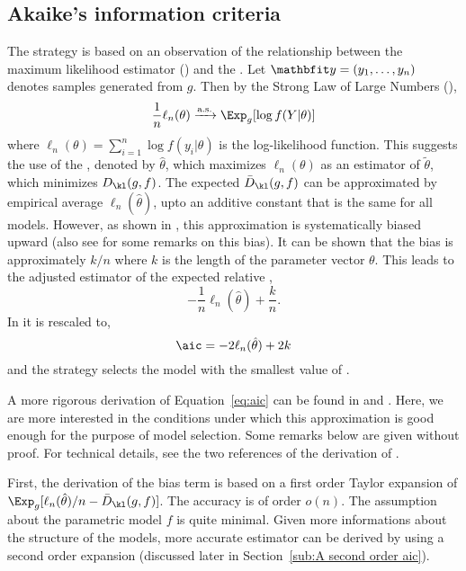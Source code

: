 \subsection{Akaike's information criteria}
\label{sub:Akaike's information criteria}

The \aic strategy is based on an observation of the relationship between the
maximum likelihood estimator (\mle) and the \kld. Let $\data =
(y_1,\dots,y_n)$ denotes \iid samples generated from $g$. Then by the Strong
Law of Large Numbers (\slln),
\begin{equation}
  \frac{1}{n}\ell_n(\theta) \xrightarrow{\text{a.s.}} \Exp_g[\log f(Y|\theta)]
  \label{eq:ml convergence}
\end{equation}
where $\ell_n(\theta) = \sum_{i=1}^n \log f(y_i|\theta)$ is the
log-likelihood function. This suggests the use of the \mle, denoted by
$\hat\theta$, which maximizes $\ell_n(\theta)$ as an estimator of
$\tilde\theta$, which minimizes $D_{\kl}(g,f)$. The expected \kld
$\bar{D}_{\kl}(g,f)$ can be approximated by empirical average
$\ell_n(\hat\theta)$, upto an additive constant that is the same for all
models. However, as shown in \cite{Akaike:1973uc}, this approximation is
systematically biased upward (also see \cite[][sec.~2.3]{Claeskens:2008tq}
for some remarks on this bias). It can be shown that the bias is
approximately $k/n$ where $k$ is the length of the parameter vector $\theta$.
This leads to the adjusted estimator of the expected relative \kld,
\begin{equation}
  -\frac{1}{n}\ell_n(\hat\theta) + \frac{k}{n}.
\end{equation}
In \cite{Akaike:1973uc} it is rescaled to,
\begin{equation}
  \aic = -2\ell_n(\hat\theta) + 2k
  \label{eq:aic}
\end{equation}
and the \aic strategy selects the model with the smallest value of \aic.

A more rigorous derivation of Equation~\eqref{eq:aic} can be found in
\cite[][sec.~2.3]{Claeskens:2008tq} and \cite[][sec.~6.2]{Burnham:2002wc}.
Here, we are more interested in the conditions under which this approximation
is good enough for the purpose of model selection. Some remarks below are
given without proof. For technical details, see the two references of the
derivation of \aic.

First, the derivation of the bias term is based on a first order Taylor
expansion of $\Exp_g[\ell_n(\hat\theta)/n - \bar{D}_{\kl}(g,f)]$. The
accuracy is of order $o(n)$. The assumption about the parametric model $f$ is
quite minimal. Given more informations about the structure of the models,
more accurate estimator can be derived by using a second order expansion
(discussed later in Section~\ref{sub:A second order aic}).

